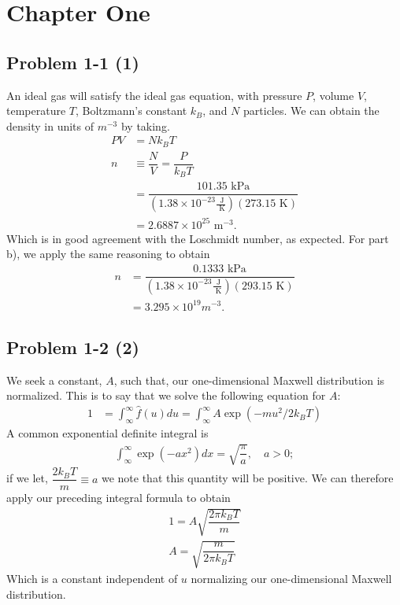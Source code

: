 \chapter*{Chapter One}
\label{ch:One}

\section*{Problem 1-1 (1)}
\label{sec:1-1}
An ideal gas will satisfy the ideal gas equation, with pressure \(P\), volume \(V\), temperature \(T\), Boltzmann's constant \(k_B\), and \(N\) particles. We can obtain the density in units of \(m^{-3}\) by taking.
\begin{align}
	PV &= Nk_BT \\
	n &\equiv \dfrac{N}{V} = \dfrac{P}{k_BT} \\
	  &= \dfrac{101.35\text{ kPa}}{(1.38\times10^{-23}\frac{\text{ J}}{\text{ K}})(273.15\text{ K})}\\
	  &= 2.6887\times10^{25}\text{ m}^{-3}.
\end{align}
Which is in good agreement with the Loschmidt number, as expected. 
For part b), we apply the same reasoning to obtain
\begin{align}
	n &= \dfrac{0.1333\text{ kPa}}{(1.38\times10^{-23}\frac{\text{ J}}{\text{ K}})(293.15\text{ K})}\\
	&= 3.295\times10^{19}m^{-3}.
\end{align}

\section*{Problem 1-2 (2)}
\label{sec:1-2}
We seek a constant, \(A\), such that, our one-dimensional Maxwell distribution is normalized. This is to say that we solve the following equation for \(A\):
\begin{align}
	1 &= \int_\infty^\infty \hat{f}(u)du = \int_\infty^\infty A \exp{(-mu^2/2k_BT)}
\end{align}
A common exponential definite integral is
\begin{align}
	\int_\infty^\infty \exp(-ax^2)dx = \sqrt{{\dfrac{\pi}{a}}}, \quad a > 0;
\end{align}
if we let, \(\dfrac{2k_BT}{m} \equiv a \) we note that this quantity will be positive. We can therefore apply our preceding integral formula to obtain
\begin{align}
	1 = A\sqrt{\dfrac{2\pi k_BT}{m}} \\
	A = \sqrt{\dfrac{m}{2\pi k_BT}}
\end{align}
Which is a constant independent of \(u\) normalizing our one-dimensional Maxwell distribution. 

